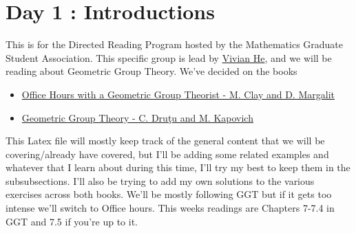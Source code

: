 \section{Day 1 : Introductions}
This is for the Directed Reading Program hosted by the Mathematics Graduate Student Association. This specific group is lead by \href{https://www.math.toronto.edu/vivianhe/Home.html}{Vivian He}, and we will be reading about Geometric Group Theory. We've decided on the books
\begin{itemize}
    \item \href{https://press.princeton.edu/books/paperback/9780691158662/office-hours-with-a-geometric-group-theorist}{Office Hours with a Geometric Group Theorist - M. Clay and D. Margalit}
    \item\href{https://www.math.ucdavis.edu/~kapovich/EPR/ggt.pdf}{Geometric Group Theory - C. Druţu and M. Kapovich}
\end{itemize}
This Latex file will mostly keep track of the general content that we will be covering/already have covered, but I'll be adding some related examples and whatever that I learn about during this time, I'll try my best to keep them in the subsubsections. I'll also be trying to add my own solutions to the various exercises across both books.
We'll be mostly following GGT but if it gets too intense we'll switch to Office hours. This weeks readings are Chapters 7-7.4 in GGT and 7.5 if you're up to it.
